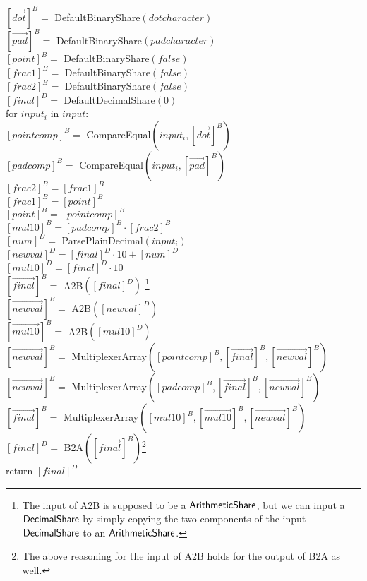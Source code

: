 \begin{protocol}
	${[\vec{dot}]^B} =$ DefaultBinaryShare$(dotcharacter)$\\
	${[\vec{pad}]^B} =$ DefaultBinaryShare$(padcharacter)$\\
	${[point]^B} =$ DefaultBinaryShare$(false)$\\
	${[frac1]^B} =$ DefaultBinaryShare$(false)$\\
	${[frac2]^B} =$ DefaultBinaryShare$(false)$\\
	${[final]^D} =$ DefaultDecimalShare$(0)$\\
	for $input_i$ in $input$:\\
	\indent ${[pointcomp]^B} =$ CompareEqual$(input_i, [\vec{dot}]^B)$\\
	\indent ${[padcomp]^B} =$ CompareEqual$(input_i, [\vec{pad}]^B)$\\
	\indent ${[frac2]^B} = {[frac1]^B}$\\
	\indent ${[frac1]^B} = {[point]^B}$\\
	\indent ${[point]^B} = {[pointcomp]^B}$\\
	\indent ${[mul10]^B} = {[padcomp]^B} \cdot {[frac2]^B}$\\
	\indent ${[num]^D} =$ ParsePlainDecimal$(input_i)$\\
	\indent ${[newval]^D} = {[final]^D} \cdot 10 + {[num]^D}$\\
	\indent ${[mul10]^D} = {[final]^D} \cdot 10$\\
        \indent ${[\vec{final}]^B} = $ A2B$([final]^D)$ \footnote{The input of A2B is supposed to be a ${\mathsf{ArithmeticShare}}$, but we can input a ${\mathsf{DecimalShare}}$ by simply copying the two components of the input ${\mathsf{DecimalShare}}$ to an ${\mathsf{ArithmeticShare}}$.}\\
        \indent ${[\vec{newval}]^B} = $ A2B$([newval]^D)$\\
        \indent ${[\vec{mul10}]^B} = $ A2B$([mul10]^D)$\\
        \indent ${[\vec{newval}]^B} = $ MultiplexerArray$([pointcomp]^B, {[\vec{final}]^B}, {[\vec{newval}]^B})$\\
        \indent ${[\vec{newval}]^B} = $ MultiplexerArray$([padcomp]^B, {[\vec{final}]^B}, {[\vec{newval}]^B})$\\
        \indent ${[\vec{final}]^B} = $ MultiplexerArray$([mul10]^B, {[\vec{mul10}]^B}, {[\vec{newval}]^B})$\\
        \indent ${[final]^D} = $ B2A$({[\vec{final}]^B})$\footnote{The above reasoning for the input of A2B holds for the output of B2A as well.}\\
        return ${[final]^D}$
\end{protocol}

